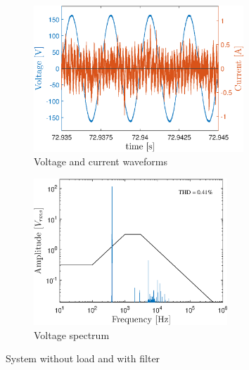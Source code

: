 \begin{doublespacing}
	\begin{figure}[!htb] %
		\centering
		\begin{subfigure}[b]{0.5\textwidth}
			\centering
			\includegraphics[height=5.5cm]{Figures/artigo_filt_1.eps}
			\caption{Voltage and current waveforms} 
			\label{fig:artigo_filt_1.eps}
		\end{subfigure}%
		\hfill
		\begin{subfigure}[b]{0.5\textwidth}  
			\centering 
			\includegraphics[height=5.5cm]{Figures/artigo_filt_2.eps}
			\caption{Voltage spectrum}    
			\label{fig:artigo_filt_2.eps}
		\end{subfigure}%
		\caption{System without load and with filter}
		\label{fig:2}
	\end{figure}
	

\end{doublespacing}
